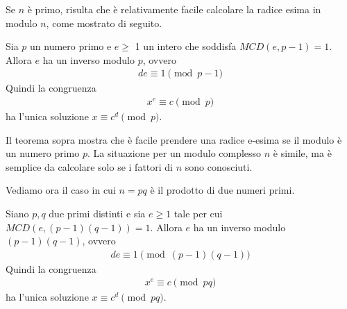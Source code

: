 Se $n$ è primo, risulta che è relativamente facile calcolare la radice esima in modulo $n$, come mostrato di seguito.

\begin{theorem}
    Sia \(p\) un numero primo e \(e \ge\) 1 un intero che soddisfa \(MCD(e, p-1)=1\). Allora \(e\) ha un inverso modulo \(p\), ovvero
    \begin{align*}
        de \equiv 1 \pmod{p-1}
    \end{align*}
    \noindent Quindi la congruenza 
    \begin{align*}
        x^e \equiv c \pmod p
    \end{align*}
    \noindent ha l'unica soluzione \(x \equiv c^d \pmod p\).
\end{theorem}

\noindent Il teorema sopra mostra che è facile prendere una radice e-esima se il modulo è un numero primo $p$. La situazione per un modulo complesso $n$ è simile, ma è semplice da calcolare solo se i fattori di $n$ sono conosciuti.

Vediamo ora il caso in cui $n = pq$ è il prodotto di due numeri primi.

\begin{theorem}
    Siano \(p, q\) due primi distinti e sia \(e \ge 1\) tale per cui \(MCD(e, (p-1)(q-1)) = 1\). Allora \(e\) ha un inverso modulo \((p-1)(q-1)\), ovvero
    \begin{align*}
        de \equiv 1 \pmod{(p-1)(q-1)}
    \end{align*}
    \noindent Quindi la congruenza 
    \begin{align*}
        x^e \equiv c \pmod{pq}
    \end{align*}
    \noindent ha l'unica soluzione \(x \equiv c^d \pmod{pq}\).
\end{theorem}

